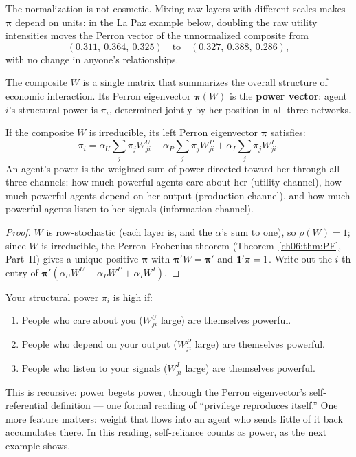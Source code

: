 \documentclass[../structural_economics_book.tex]{subfiles}
\begin{document}
The normalization is not cosmetic. Mixing raw layers with different scales makes $\boldsymbol{\pi}$ depend on units: in the La Paz example below, doubling the raw utility intensities moves the Perron vector of the unnormalized composite from
\begin{equation*}
(0.311,\ 0.364,\ 0.325) \quad\text{to}\quad (0.327,\ 0.388,\ 0.286),
\end{equation*}
with no change in anyone's relationships.

The composite $W$ is a single matrix that summarizes the overall structure of economic interaction. Its Perron eigenvector $\boldsymbol{\pi}(W)$ is the \textbf{power vector}: agent $i$'s structural power is $\pi_i$, determined jointly by her position in all three networks.

\begin{proposition}\label{ch05:prop:composite_power}
If the composite $W$ is irreducible, its left Perron eigenvector $\boldsymbol{\pi}$ satisfies:
\begin{equation}
\pi_i = \alpha_U \sum_j \pi_j W^U_{ji} + \alpha_P \sum_j \pi_j W^P_{ji} + \alpha_I \sum_j \pi_j W^I_{ji}.
\end{equation}
An agent's power is the weighted sum of power directed toward her through all three channels: how much powerful agents care about her (utility channel), how much powerful agents depend on her output (production channel), and how much powerful agents listen to her signals (information channel).
\end{proposition}

\begin{proof}
$W$ is row-stochastic (each layer is, and the $\alpha$'s sum to one), so $\rho(W) = 1$; since $W$ is irreducible, the Perron--Frobenius theorem (Theorem~\ref{ch06:thm:PF}, Part~II) gives a unique positive $\boldsymbol{\pi}$ with $\boldsymbol{\pi}'W = \boldsymbol{\pi}'$ and $\mathbf{1}'\pi = 1$. Write out the $i$-th entry of $\boldsymbol{\pi}'(\alpha_U W^U + \alpha_P W^P + \alpha_I W^I)$.
\end{proof}

\begin{intuition}
Your structural power $\pi_i$ is high if:
\begin{enumerate}
\item People who care about you ($W^U_{ji}$ large) are themselves powerful.
\item People who depend on your output ($W^P_{ji}$ large) are themselves powerful.
\item People who listen to your signals ($W^I_{ji}$ large) are themselves powerful.
\end{enumerate}
This is recursive: power begets power, through the Perron eigenvector's self-referential definition --- one formal reading of ``privilege reproduces itself.'' One more feature matters: weight that flows into an agent who sends little of it back accumulates there. In this reading, self-reliance counts as power, as the next example shows.
\end{intuition}
\end{document}
